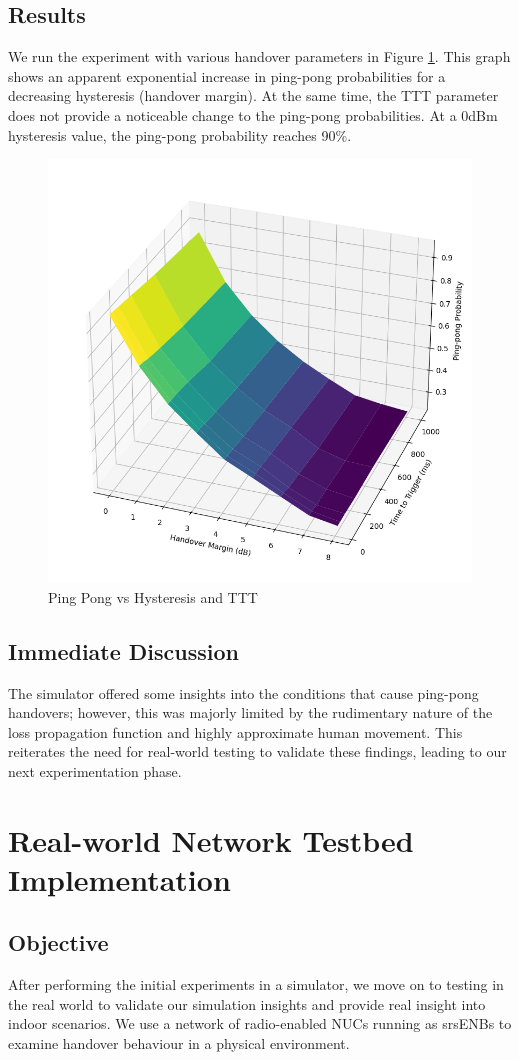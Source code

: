 \subsection{Results}
We run the experiment with various handover parameters in Figure \ref{fig:methods:pingpong-uesim}. This graph shows an apparent exponential increase in ping-pong probabilities for a decreasing hysteresis (handover margin). At the same time, the TTT parameter does not provide a noticeable change to the ping-pong probabilities. At a 0dBm hysteresis value, the ping-pong probability reaches 90\%.
\begin{figure}
    \centering
    \includegraphics[width=0.5\linewidth]{src//img/custom_pingpong.png}
    \caption{Ping Pong vs Hysteresis and TTT}
    \label{fig:methods:pingpong-uesim}
\end{figure}
\subsection{Immediate Discussion}
The simulator offered some insights into the conditions that cause ping-pong handovers; however, this was majorly limited by the rudimentary nature of the loss propagation function and highly approximate human movement. This reiterates the need for real-world testing to validate these findings, leading to our next experimentation phase.


\section{Real-world Network Testbed Implementation}

\subsection{Objective}
After performing the initial experiments in a simulator, we move on to testing in the real world to validate our simulation insights and provide real insight into indoor scenarios. We use a network of radio-enabled NUCs running as srsENBs to examine handover behaviour in a physical environment.

